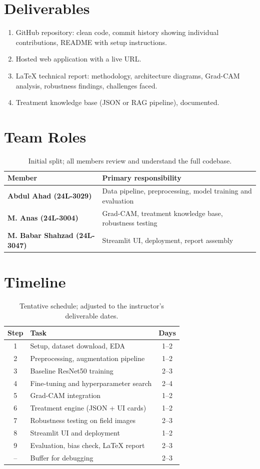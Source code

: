 \documentclass[11pt,a4paper]{article}
\begin{document}
\section{Deliverables}
\begin{enumerate}
  \item GitHub repository: clean code, commit history showing individual contributions, README with setup instructions.
  \item Hosted web application with a live URL.
  \item \LaTeX{} technical report: methodology, architecture diagrams, Grad-CAM analysis, robustness findings, challenges faced.
  \item Treatment knowledge base (JSON or RAG pipeline), documented.
\end{enumerate}

\section{Team Roles}
\begin{table}[h]
\centering
\begin{tabular}{@{}>{\bfseries}p{3cm}p{11.4cm}@{}}
\toprule
Member & Primary responsibility \\
\midrule
Abdul Ahad (24L-3029) & Data pipeline, preprocessing, model training and evaluation \\
M. Anas (24L-3004) & Grad-CAM, treatment knowledge base, robustness testing \\
M. Babar Shahzad (24L-3047) & Streamlit UI, deployment, report assembly \\
\bottomrule
\end{tabular}
\caption{Initial split; all members review and understand the full codebase.}
\end{table}

\section{Timeline}
\begin{table}[h]
\centering
\begin{tabular}{@{}cp{9cm}c@{}}
\toprule
Step & Task & Days \\
\midrule
1 & Setup, dataset download, EDA & 1--2 \\
2 & Preprocessing, augmentation pipeline & 1--2 \\
3 & Baseline ResNet50 training & 2--3 \\
4 & Fine-tuning and hyperparameter search & 2--4 \\
5 & Grad-CAM integration & 1--2 \\
6 & Treatment engine (JSON + UI cards) & 1--2 \\
7 & Robustness testing on field images & 2--3 \\
8 & Streamlit UI and deployment & 1--2 \\
9 & Evaluation, bias check, \LaTeX{} report & 2--3 \\
-- & Buffer for debugging & 2--3 \\
\bottomrule
\end{tabular}
\caption{Tentative schedule; adjusted to the instructor's deliverable dates.}
\end{table}
\end{document}
